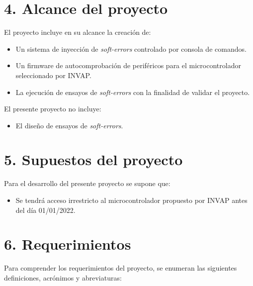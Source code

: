 \documentclass[
11pt, %
]{charter}
\begin{document}
\section{4. Alcance del proyecto}
\label{sec:alcance}

El proyecto incluye en su alcance la creación de:
\begin{itemize}
	\item Un sistema de inyección de \emph{soft-errors} controlado por consola de comandos.
	\item Un firmware de autocomprobación de periféricos para el microcontrolador seleccionado por INVAP.
	\item La ejecución de ensayos de \emph{soft-errors} con la finalidad de validar el proyecto.
\end{itemize}

El presente proyecto no incluye:

\begin{itemize}
	\item El diseño de ensayos de \emph{soft-errors}.
\end{itemize}


\section{5. Supuestos del proyecto}
\label{sec:supuestos}

Para el desarrollo del presente proyecto se supone que:

\begin{itemize}
	\item Se tendrá acceso irrestricto al microcontrolador propuesto por INVAP antes del día 01/01/2022.
\end{itemize}


\section{6. Requerimientos}
\label{sec:requerimientos}

Para comprender los requerimientos del proyecto, se enumeran las siguientes definiciones, acrónimos y abreviaturas:
\end{document}
